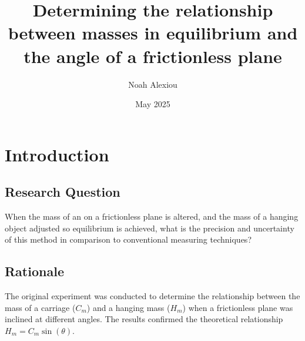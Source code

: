 \documentclass[11pt,a4paper]{article}
\begin{document}
\nocite{*}

\begin{titlepage}


\title{Determining the relationship between masses in equilibrium and the angle of a frictionless plane}

\author{Noah Alexiou}


\date{May 2025}

\maketitle
\centering

\end{titlepage}
\tableofcontents
\newpage

\section{Introduction}

\subsection{Research Question}
When the mass of an on a frictionless plane is altered, and the mass of a hanging object adjusted so equilibrium is achieved, what is the precision and uncertainty of this method in comparison to conventional measuring techniques? 

\subsection{Rationale}

The original experiment was conducted to determine the relationship between the mass of a carriage ($C_m$) and a hanging mass ($H_m$) when a frictionless plane was inclined at different angles. The results confirmed the theoretical relationship $H_m = C_m \sin(\theta)$.
\end{document}
